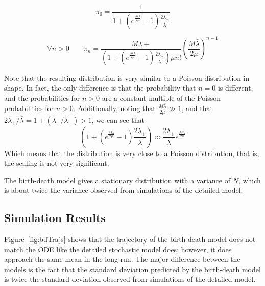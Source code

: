 \documentclass[titlepage]{article}
\begin{document}
\begin{equation*}
\pi_0 = \frac{1}{ 1 + \left( e^\frac{M \bar\lambda}{2 \mu} - 1 \right) \frac{2 \lambda_+}{\bar\lambda} }
\end{equation*}

\begin{equation*}
\forall n > 0 \qquad \pi_n = \frac{M \lambda+}{ \left( 1 + \left( e^\frac{M \bar\lambda}{2 \mu} - 1 \right) \frac{2 \lambda_+}{\bar\lambda} \right) \mu n! } \left( \frac{M \bar\lambda}{2 \mu} \right)^{n-1}
\end{equation*}

Note that the resulting distribution is very similar to a Poisson distribution in shape.
In fact, the only difference is that the probability that $n=0$ is different, and the probabilities for $n>0$ are a constant multiple of the Poisson probabilities for $n>0$.
Additionally, noting that $\frac{M\bar\lambda}{2\mu} \gg 1$, and that $2\lambda_+ / \bar\lambda = 1 + ( \lambda_+ / \lambda_- ) > 1$, we can see that
\begin{equation*}
( 1 + ( e^\frac{M\bar\lambda}{2\mu} - 1 ) \frac{2 \lambda_+}{\bar\lambda} )
\approx \frac{2 \lambda_+}{\bar\lambda} e^\frac{M\bar\lambda}{2\mu}
\end{equation*}
Which means that the distribution is very close to a Poisson distribution, that is, the scaling is not very significant.

The birth-death model gives a stationary distribution with a variance of $\bar{N}$, which is about twice the variance observed from simulations of the detailed model.

\subsection{Simulation Results}
Figure~\ref{fig:bdTrajs} shows that the trajectory of the birth-death model does not match the ODE like the detailed stochastic model does; however, it does approach the same mean in the long run.
The major difference between the models is the fact that the standard deviation predicted by the birth-death model is twice the standard deviation observed from simulations of the detailed model.
\end{document}
